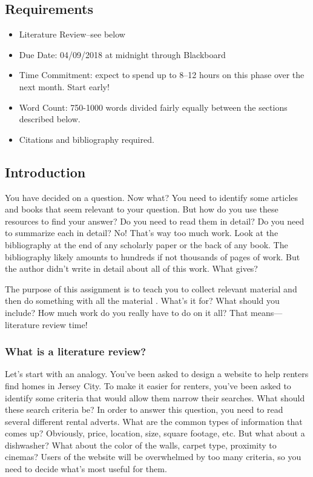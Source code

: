 \documentclass[oneside]{article}
\begin{document}
\thispagestyle{fancy}

\subsection*{Requirements}\label{independent-project-stage-2}

\begin{itemize}
\itemsep1pt\parskip0pt
\item
  Literature Review--see below
\item
  Due Date: 04/09/2018 at midnight through Blackboard
\item Time Commitment: expect to spend up to 8--12 hours on this phase over the next month. Start early!
\item
  Word Count: 750-1000 words divided fairly equally between the sections
  described below.
\item
  Citations and bibliography required.
\end{itemize}

\subsection*{Introduction}\label{introduction}

You have decided on a question.  Now what? You need to identify some articles and
books that seem relevant to your question. But how do you use these resources to find
your answer? Do you need to read them in detail? Do you need to
summarize each in detail? No! That's way too much work. Look at the
bibliography at the end of any scholarly paper or the back of any book.
The bibliography likely amounts to hundreds if not thousands of pages of
work. But the author didn't write in detail about all of this work. What
gives?

The purpose of this assignment is to teach you to collect relevant material and then do something with all the
material . What's it for? What should you include? How
much work do you really have to do on it all? That means---literature
review time!

\subsubsection{What is a literature
review?}\label{what-is-a-literature-review}

Let's start with an analogy. You've been asked to design a website to
help renters find homes in Jersey City. To make it easier for renters,
you've been asked to identify some criteria that would allow them narrow
their searches. What should these search criteria be? In order to answer
this question, you need to read several different rental adverts. What
are the common types of information that comes up? Obviously, price,
location, size, square footage, etc. But what about a dishwasher? What
about the color of the walls, carpet type, proximity to cinemas? Users
of the website will be overwhelmed by too many criteria, so you need to
decide what's most useful for them.
\end{document}
